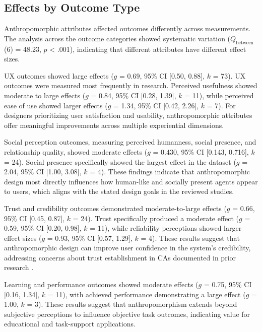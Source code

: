 \documentclass[manuscript,screen,review,anonymous]{acmart}
\begin{document}
\subsection{Effects by Outcome Type} \label{sec:out}

Anthropomorphic attributes affected outcomes differently across measurements. The analysis across the outcome categories showed systematic variation ($Q_{\text{between}}$(6) = 48.23, $p$ < .001), indicating that different attributes have different effect sizes.

UX outcomes showed large effects ($g$ = 0.69, 95\% CI [0.50, 0.88], $k$ = 73). UX outcomes were measured most frequently in research. Perceived usefulness showed moderate to large effects ($g$ = 0.84, 95\% CI [0.28, 1.39], $k$ = 11), while perceived ease of use showed larger effects ($g$ = 1.34, 95\% CI [0.42, 2.26], $k$ = 7). For designers prioritizing user satisfaction and usability, anthropomorphic attributes offer meaningful improvements across multiple experiential dimensions.

Social perception outcomes, measuring perceived humanness, social presence, and relationship quality, showed moderate effects ($g$ = 0.430, 95\% CI [0.143, 0.716], $k$ = 24). Social presence specifically showed the largest effect in the dataset ($g$ = 2.04, 95\% CI [1.00, 3.08], $k$ = 4). These findings indicate that anthropomorphic design most directly influences how human-like and socially present agents appear to users, which aligns with the stated design goals in the reviewed studies.

Trust and credibility outcomes demonstrated moderate-to-large effects ($g$ = 0.66, 95\% CI [0.45, 0.87], $k$ = 24). Trust specifically produced a moderate effect ($g$ = 0.59, 95\% CI [0.20, 0.98], $k$ = 11), while reliability perceptions showed larger effect sizes ($g$ = 0.93, 95\% CI [0.57, 1.29], $k$ = 4). These results suggest that anthropomorphic design can improve user confidence in the system's credibility, addressing concerns about trust establishment in CAs documented in prior research \cite{ng2025trust}.

Learning and performance outcomes showed moderate effects ($g$ = 0.75, 95\% CI [0.16, 1.34], $k$ = 11), with achieved performance demonstrating a large effect ($g$ = 1.00, $k$ = 3). These results suggest that anthropomorphism extends beyond subjective perceptions to influence objective task outcomes, indicating value for educational and task-support applications.
\end{document}
